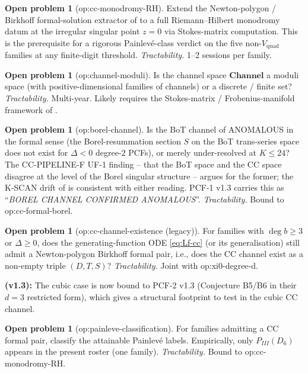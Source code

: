 \documentclass[11pt,reqno]{amsart}
\theoremstyle{plain}
\theoremstyle{definition}
\newtheorem{problem}[theorem]{Open problem}
\theoremstyle{remark}
\newcommand{\Channel}{\mathbf{Channel}}
\newcommand{\CC}{\mathrm{CC}}
\newcommand{\Vquad}{V_{\mathrm{quad}}}
\begin{document}
\begin{problem}[\textsf{op:cc-monodromy-RH}]
Extend the Newton-polygon / Birkhoff formal-solution extractor
of \cite{siarc_cc_pipeline_g} to a full Riemann--Hilbert
monodromy datum at the irregular singular point $z=0$ via
Stokes-matrix computation. This is the prerequisite for a
rigorous Painlev\'e-class verdict on the five non-$\Vquad$
families at any finite-digit threshold.
\emph{Tractability.} 1--2 sessions per family.
\end{problem}

\begin{problem}[\textsf{op:channel-moduli}]
Is the channel space $\Channel$ a moduli space (with
positive-dimensional families of channels) or a discrete /
finite set?
\emph{Tractability.} Multi-year. Likely requires the
Stokes-matrix / Frobenius-manifold framework of
\cite{boalch2001stokes}.
\end{problem}

\begin{problem}[\textsf{op:borel-channel}]
Is the BoT channel of  ANOMALOUS in the formal
sense (the Borel-resummation section $S$ on the BoT
trans-series space does not exist for $\Delta<0$ degree-$2$
PCFs), or merely under-resolved at $K \le 24$?
The CC-PIPELINE-F UF-1 finding
\cite{siarc_cc_pipeline_f} -- that the BoT space and the
$\CC$ space disagree at the level of the Borel singular
structure -- argues for the former; the K-SCAN drift of
\cite{siarc_borel_kscan} is consistent with either reading.
PCF-1 v1.3 \cite{siarc_pcf1_v13} carries this as
``\emph{BOREL CHANNEL CONFIRMED ANOMALOUS}''.
\emph{Tractability.} Bound to \textsf{op:cc-formal-borel}.
\end{problem}

\begin{problem}[\textsf{op:cc-channel-existence} (legacy)]
For families with $\deg b \ge 3$ or $\Delta \ge 0$, does the
generating-function ODE \eqref{eq:Lf-cc} (or its
generalisation) still admit a Newton-polygon Birkhoff
formal pair, i.e., does the $\CC$ channel exist as a non-empty
triple $(D, T, S)$?
\emph{Tractability.} Joint with \textsf{op:xi0-degree-d}.

\textbf{(v1.3):} The cubic case is now bound to PCF-2 v1.3
\cite{siarc_pcf2_v13} (Conjecture B5/B6 in their $d=3$
restricted form), which gives a structural footprint to
test in the cubic CC channel.
\end{problem}

\begin{problem}[\textsf{op:painleve-classification}]
For families admitting a $\CC$ formal pair, classify the
attainable Painlev\'e labels. Empirically, only $P_{III}(D_6)$
appears in the present roster (one family).
\emph{Tractability.} Bound to \textsf{op:cc-monodromy-RH}.
\end{problem}
\end{document}
